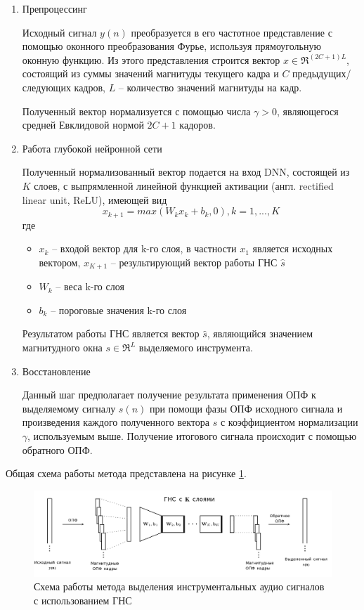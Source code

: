 \begin{enumerate}
	\item Препроцессинг
	
	Исходный сигнал $y(n)$ преобразуется в его частотное представление с помощью оконного преобразования Фурье, используя прямоугольную оконную функцию. Из этого представления строится вектор $x \in \Re^{(2C+1)L}$, состоящий из суммы значений магнитуды текущего кадра и $C$ предыдущих/следующих кадров, $L$ -- количество значений магнитуды на кадр.
	
	Полученный вектор нормализуется с помощью числа $\gamma > 0$, являющегося средней Евклидовой нормой $2C+1$ кадоров.
	
	\item Работа глубокой нейронной сети
	
	Полученный нормализованный вектор подается на вход DNN, состоящей из $K$ слоев, с выпрямленной линейной функцией активации (англ. rectified linear unit, ReLU), имеющей вид
	\begin{equation}
	x_{k+1} = max(W_k x_k + b_k , 0), k = 1, ..., K
	\label{anal:relu}
	\end{equation}
	где 
	\begin{itemize}
		\item $x_k$ -- входой вектор для k-го слоя, в частности $x_1$ является исходных вектором, $x_{K+1}$ -- результирующий вектор работы ГНС $\hat s$
		\item $W_k$ -- веса k-го слоя
		\item $b_k$ -- пороговые значения k-го слоя
	\end{itemize}

	Результатом работы ГНС является вектор $\hat s$, являющийся значением магнитудного окна $s \in \Re^L$ выделяемого инструмента.
	
	\item Восстановление
	
	Данный шаг предполагает получение результата применения ОПФ к выделяемому сигналу $s(n)$ при помощи фазы ОПФ исходного сигнала и произведения каждого полученного вектора $\hat{s}$ с коэффициентом нормализации $\gamma$, используемым выше. Получение итогового сигнала происходит с помощью обратного ОПФ.
	
\end{enumerate}

Общая схема работы метода представлена на рисунке \ref{anal:DNN-inst}.

\begin{figure}
	\centering
	\includegraphics[width=\textwidth]{inc/img/DNN-inst.png}
	\caption{Схема работы метода выделения инструментальных аудио сигналов с использованием ГНС}
	\label{anal:DNN-inst}
\end{figure}

